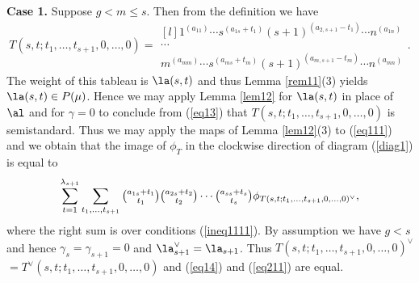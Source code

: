 \textbf{Case 1.} Suppose $g<m \le s$. Then from the definition we have \begin{equation}\label{eq13}T(s,t;t_1,\dots,t_{s+1},0,\dots,0)=\begin{matrix*}[l]
		1^{(a_{11})} \cdots s^{(a_{1s}+t_1)}(s+1)^{(a_{2,s+1}-t_1)} \cdots n^{(a_{1n})} \\
		\cdots \\ 
		m^{(a_{mm})}\cdots s^{(a_{ms}+t_m)}(s+1)^{(a_{m,s+1}-t_m)} \cdots n^{(a_{mn})}   \end{matrix*}.\end{equation}
The weight of this tableau is $\la(s,t)$ and thus Lemma \ref{rem11}(3) yields $\la(s,t) \in P(\mu)$. Hence we may apply Lemma \ref{lem12} for $\la(s,t)$ in place of $\al$ and for $\gamma=0$ to conclude from (\ref{eq13}) that $T(s,t;t_1,\dots,t_{s+1},0,\dots,0)$ is semistandard. Thus we may apply the maps of Lemma \ref{lem12}(3) to  (\ref{eq111}) and we obtain that the image of $\phi_T$  in the clockwise direction of diagram (\ref{diag1}) is equal to 
\begin{equation}\label{eq14}
	\sum_{t=1}^{\lambda_{s+1}}\sum_{t_1,\dots,t_{s+1}}\tbinom{a_{1s}+t_1}{t_1}\tbinom{a_{2s}+t_2}{t_2} \cdots \tbinom{a_{ss}+t_s}{t_s}\phi_{T(s,t;t_1,\dots,t_{s+1},0,\dots,0)^{\vee}},\end{equation}
where the right sum is over conditions (\ref{ineq1111}).
By assumption we have $g < s$ and hence $\gamma_s=\gamma_{s+1}=0 $ and $\la^{\vee}_{s+1}=\la_{s+1}$. Thus $T(s,t;t_1,\dots,t_{s+1},0,\dots,0)^{\vee}$ $=T^{\vee}(s,t;t_1,\dots,t_{s+1},0,\dots,0)$ and (\ref{eq14}) and (\ref{eq211}) are equal.

